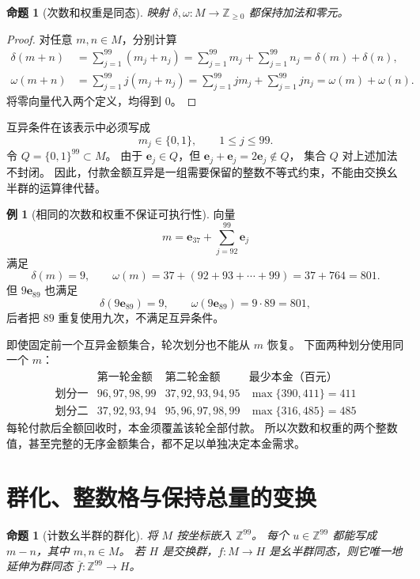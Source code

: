 \documentclass[UTF8,a4paper]{ctexbook}
\newtheorem{proposition}[theorem]{命题}
\theoremstyle{definition}
\newtheorem{example}[theorem]{例}
\numberwithin{equation}{chapter}
\newcommand{\1}{\mathbf{1}}
\begin{document}
\begin{proposition}[次数和权重是同态]\label{aa:two-invariants}
映射 \(\delta,\omega:M\to\mathbb Z_{\ge0}\) 都保持加法和零元。
\end{proposition}

\begin{proof}
对任意 \(m,n\in M\)，分别计算
\[
\begin{aligned}
\delta(m+n)
&=\sum_{j=1}^{99}(m_j+n_j)
=\sum_{j=1}^{99}m_j+\sum_{j=1}^{99}n_j
=\delta(m)+\delta(n),\\
\omega(m+n)
&=\sum_{j=1}^{99}j(m_j+n_j)
=\sum_{j=1}^{99}jm_j+\sum_{j=1}^{99}jn_j
=\omega(m)+\omega(n).
\end{aligned}
\]
将零向量代入两个定义，均得到 \(0\)。
\end{proof}

互异条件在该表示中必须写成
\[
m_j\in\{0,1\},\qquad 1\le j\le99.
\]
令 \(Q=\{0,1\}^{99}\subset M\)。
由于 \(\mathbf e_j\in Q\)，但
\(\mathbf e_j+\mathbf e_j=2\mathbf e_j\notin Q\)，
集合 \(Q\) 对上述加法不封闭。
因此，付款金额互异是一组需要保留的整数不等式约束，不能由交换幺半群的运算律代替。

\begin{example}[相同的次数和权重不保证可执行性]\label{aa:lost-information}
向量
\[
m=\mathbf e_{37}+\sum_{j=92}^{99}\mathbf e_j
\]
满足
\[
\delta(m)=9,\qquad
\omega(m)=37+(92+93+\cdots+99)=37+764=801.
\]
但 \(9\mathbf e_{89}\) 也满足
\[
\delta(9\mathbf e_{89})=9,\qquad
\omega(9\mathbf e_{89})=9\cdot89=801,
\]
后者把 \(89\) 重复使用九次，不满足互异条件。

即使固定前一个互异金额集合，轮次划分也不能从 \(m\) 恢复。
下面两种划分使用同一个 \(m\)：
\[
\begin{array}{c|c|c|c}
 &\text{第一轮金额}&\text{第二轮金额}&\text{最少本金（百元）}\\ \hline
\text{划分一}&96,97,98,99&37,92,93,94,95&\max\{390,411\}=411\\
\text{划分二}&37,92,93,94&95,96,97,98,99&\max\{316,485\}=485
\end{array}
\]
每轮付款后全额回收时，本金须覆盖该轮全部付款。
所以次数和权重的两个整数值，甚至完整的无序金额集合，都不足以单独决定本金需求。
\end{example}

\section{群化、整数格与保持总量的变换}

\begin{proposition}[计数幺半群的群化]\label{aa:completion}
将 \(M\) 按坐标嵌入 \(\mathbb Z^{99}\)。
每个 \(u\in\mathbb Z^{99}\) 都能写成 \(m-n\)，其中 \(m,n\in M\)。
若 \(H\) 是交换群，\(f:M\to H\) 是幺半群同态，则它唯一地延伸为群同态
\(\overline f:\mathbb Z^{99}\to H\)。
\end{proposition}
\end{document}

